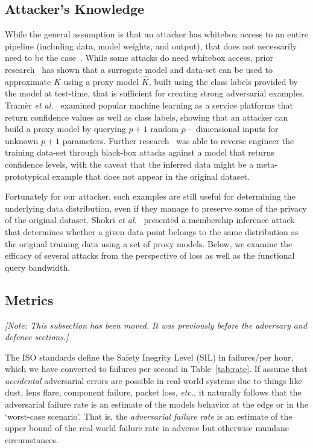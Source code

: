 \documentclass[journal]{IEEEtran}
\newcommand{\cm}[1]{\textit{{\color{blue}#1}}}
\begin{document}
\subsection{Attacker's Knowledge}
 While the general assumption is that an attacker has whitebox access to an entire pipeline (including data, model weights, and output), that does not necessarily need to be the case~\cite{hopskipjump, chakraborty_adversarial_2018}. While some attacks do need whitebox access, prior research~\cite{hopskipjump, nelson2010behavior} has shown that a surrogate model and data-set can be used to approximate $K$ using a proxy model $\widehat{K}$, built using the class labels provided by the model at test-time, that is sufficient for creating strong adversarial examples. Tram\`er \textit{et al.}~\cite{tramer2016stealing} examined popular machine learning as a service platforms that return confidence values as well as class labels, showing that an attacker can build a proxy model by querying $ p + 1$ random $p-$dimensional inputs for unknown $p+1$ parameters. Further research~\cite{fredrikson_model_2015} was able to reverse engineer the training data-set through black-box attacks against a model that returns confidence levels, with the caveat that the inferred data might be a meta-prototypical example that does not appear in the original dataset. 

Fortunately for our attacker, such examples are still useful for determining the underlying data distribution, even if they manage to preserve some of the privacy of the original dataset. Shokri \textit{et al.}~\cite{shokri2017membership} presented a membership inference attack that determines whether a given data point belongs to the same distribution as the original training data using a set of proxy models.  Below, we examine the efficacy of several attacks from the perspective of loss as well as the functional query bandwidth.



\subsection{Metrics}

\cm{[Note: This subsection has been moved. It was previously before the adversary and defence sections.]}

\label{metrics}
The ISO standards \cite{iso26262} define the Safety Inegrity Level (SIL) in failures/per hour, which we have converted to failures per second in Table~\ref{tab:rate}. If assume that \textit{accidental} adversarial errors are possible in real-world systems due to things like dust, lens flare, component failure, packet loss, \textit{etc.}, it naturally follows that the adversarial failure rate is an estimate of the models behavior at the edge or in the `worst-case scenario'. That is, the \textit{adversarial failure rate} is an estimate of the upper bound of the real-world failure rate in adverse but otherwise mundane circumstances. 
\end{document}
